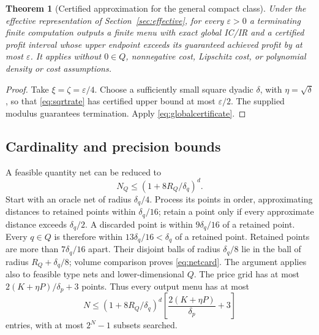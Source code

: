 \documentclass[11pt,a4paper]{article}
\numberwithin{equation}{section}
\newtheorem{theorem}{Theorem}
\begin{document}
\begin{theorem}[Certified approximation for the general compact class]
\label{thm:algorithm}
Under the effective representation of Section~\ref{sec:effective},
for every \(\varepsilon>0\) a terminating finite computation outputs a
finite menu with exact global IC/IR and a certified profit interval
whose upper endpoint exceeds its guaranteed achieved profit by at most
\(\varepsilon\).
It applies without \(0\in Q\), nonnegative cost, Lipschitz cost,
or polynomial density or cost assumptions.
\end{theorem}
\begin{proof}
Take \(\xi=\zeta=\varepsilon/4\).
Choose a sufficiently small square dyadic \(\delta\), with
\(\eta=\sqrt\delta\), so that \eqref{eq:sqrtrate} has certified upper
bound at most \(\varepsilon/2\).
The supplied modulus guarantees termination.
Apply \eqref{eq:globalcertificate}.
\end{proof}

\subsection{Cardinality and precision bounds}
A feasible quantity net can be reduced to
\begin{equation}\label{eq:netcard}
 N_Q\le(1+8R_Q/\delta_q)^d.
\end{equation}
Start with an oracle net of radius \(\delta_q/4\).
Process its points in order, approximating distances to retained
points within \(\delta_q/16\); retain a point only if every approximate
distance exceeds \(\delta_q/2\).
A discarded point is within \(9\delta_q/16\) of a retained point.
Every \(q\in Q\) is therefore within \(13\delta_q/16<\delta_q\)
of a retained point.
Retained points are more than \(7\delta_q/16\) apart.
Their disjoint balls of radius \(\delta_q/8\) lie in the ball of
radius \(R_Q+\delta_q/8\); volume comparison proves \eqref{eq:netcard}.
The argument applies also to feasible type nets and lower-dimensional \(Q\).
The price grid has at most \(2(K+\eta P)/\delta_p+3\) points.
Thus every output menu has at most
\begin{equation}\label{eq:contractcard}
 N\le(1+8R_Q/\delta_q)^d
             \left[\frac{2(K+\eta P)}{\delta_p}+3\right]
\end{equation}
entries, with at most \(2^N-1\) subsets searched.
\end{document}

